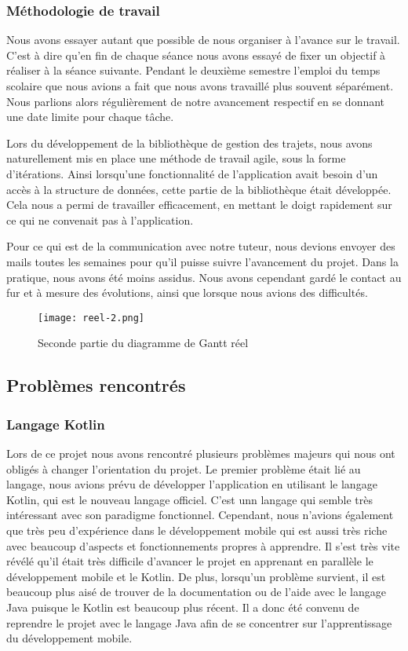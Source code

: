 \subsubsection{Méthodologie de travail}
Nous avons essayer autant que possible de nous organiser à l'avance sur le travail. C'est à dire qu'en fin de chaque séance nous avons essayé de fixer un objectif à réaliser à la séance suivante.
Pendant le deuxième semestre l'emploi du temps scolaire que nous avions a fait que nous avons travaillé plus souvent séparément. Nous parlions alors régulièrement de notre avancement respectif en se donnant une date limite pour chaque tâche.
\par
Lors du développement de la bibliothèque de gestion des trajets, nous avons naturellement mis en place une méthode de travail agile, sous la forme d'itérations. Ainsi lorsqu'une fonctionnalité de l'application avait besoin d'un accès à la structure de données, cette partie de la bibliothèque était développée.
Cela nous a permi de travailler efficacement, en mettant le doigt rapidement sur ce qui ne convenait pas à l'application.
\par
Pour ce qui est de la communication avec notre tuteur, nous devions envoyer des mails toutes les semaines pour qu'il puisse suivre l'avancement du projet. Dans la pratique, nous avons été moins assidus. Nous avons cependant gardé le contact au fur et à mesure des évolutions, ainsi que lorsque nous avions des difficultés.
\vfill
\begin{figure}[!h]
    \begin{center}
        \texttt{[image: reel-2.png]}
        \caption{Seconde partie du diagramme de Gantt réel}
    \end{center}
\end{figure}
\newpage




\subsection{Problèmes rencontrés}
\subsubsection{Langage Kotlin}
Lors de ce projet nous avons rencontré plusieurs problèmes majeurs qui nous ont obligés à changer l'orientation du projet.
Le premier problème était lié au langage, nous avions prévu de développer l'application en utilisant le langage Kotlin, qui est le nouveau langage officiel.
C'est unn langage qui semble très intéressant avec son paradigme fonctionnel. Cependant, nous n'avions également que très peu d'expérience
dans le développement mobile qui est aussi très riche avec beaucoup d'aspects et fonctionnements propres à apprendre. Il s'est très vite révélé
qu'il était très difficile d'avancer le projet en apprenant en parallèle le développement mobile et le Kotlin. De plus, lorsqu'un problème
survient, il est beaucoup plus aisé de trouver de la documentation ou de l'aide avec le langage Java puisque le Kotlin est beaucoup plus récent.
Il a donc été convenu de reprendre le projet avec le langage Java afin de se concentrer sur l'apprentissage du développement mobile.
